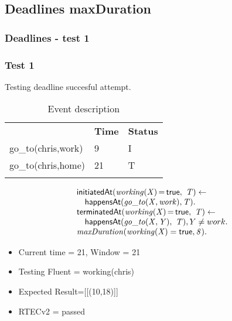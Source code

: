 \documentclass[8pt]{beamer}
\DeclareMathOperator{\val}{=}  %
\def \patsize {}
\def\happensAt{\textsf{\patsize happensAt}}
\def\initiatedAt{\textsf{\patsize initiatedAt}}
\def\terminatedAt{\textsf{\patsize terminatedAt}}
\def\true{\textsf{\patsize true}}
\newenvironment{mysplit}%
  {\arraycolsep 0pt \begin{array}{l}}%
  {\end{array}}
\begin{document}
\subsection{Deadlines maxDuration}

\begin{frame}
    \frametitle{Deadlines - test 1}
    \subsubsection{Test 1}
    \small
    Testing deadline succesful attempt.\linebreak
    \begin{minipage}{0.48\linewidth}
        \begin{table}[t!]
            \caption{Event description}
            \begin{center}

                \begin{tabular}{lll}
                    \hline\noalign{\smallskip}
                    \multicolumn{1}{l}{\textbf{Event}} & \multicolumn{1}{c}{\textbf{Time}} & \multicolumn{1}{c}{\textbf{Status}} \\
                    go\_to(chris,work)& 9 & I\\
                    go\_to(chris,home)& 21 & T\\
                    \noalign{\smallskip}
                    \hline
                \end{tabular}
            \end{center}
        \end{table}
    \end{minipage}
    \begin{minipage}{0.48\linewidth}
        \begin{align*}
            \begin{mysplit}
                \initiatedAt\mathit{(working(X)\val\true,\ T)\leftarrow}\\
                \quad    \happensAt\mathit{(go\_to(X,work),T)}.\\
                \terminatedAt\mathit{(working(X)\val\true,\ T) \leftarrow}\\
                \quad    \happensAt\mathit{(go\_to(X,Y),\ T)},Y\neq work.\\
                \mathit{maxDuration(working(X)=\true,8)}.\\
            \end{mysplit}
        \end{align*}
    \end{minipage}
    \begin{itemize}
        \item Current time = 21, Window = 21
        \item Testing Fluent = working(chris)
        \item Expected Result=[[(10,18)]]
        \item RTECv2 = passed
    \end{itemize}
\end{frame}
\end{document}
